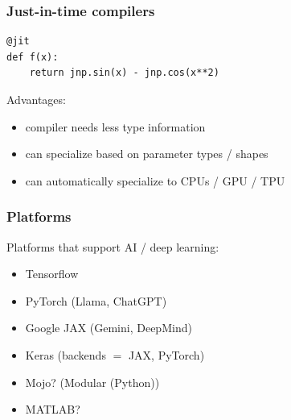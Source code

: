 \documentclass[
    xcolor={svgnames,dvipsnames},
    hyperref={colorlinks, citecolor=DeepPink4, linkcolor=DarkRed, urlcolor=DarkBlue}
    ]{beamer}  %
\newcommand{\1}{\mathbbm 1}
\begin{document}
\begin{frame}[fragile]
    \frametitle{Just-in-time compilers}

    \vspace{0.5em}
    
    \begin{verbatim}
@jit
def f(x):
    return jnp.sin(x) - jnp.cos(x**2)
    \end{verbatim}

    Advantages:

    \begin{itemize}
        \item compiler needs less type information
        \item can specialize based on parameter types / shapes
        \item can automatically specialize to CPUs / GPU / TPU 
    \end{itemize}

\end{frame}

\begin{frame}
    \frametitle{Platforms}
    
    Platforms that support AI / deep learning:

    \vspace{0.5em}
    \begin{itemize}
        \item Tensorflow
        \vspace{0.5em}
        \item PyTorch (Llama, ChatGPT)
        \vspace{0.5em}
        \item Google JAX (Gemini, DeepMind)
        \vspace{0.5em}
        \item Keras (backends $=$ JAX, PyTorch)
        \vspace{0.5em}
        \item Mojo? (Modular (Python))
        \vspace{0.5em}
        \item MATLAB? 
    \end{itemize}

\end{frame}
\end{document}
